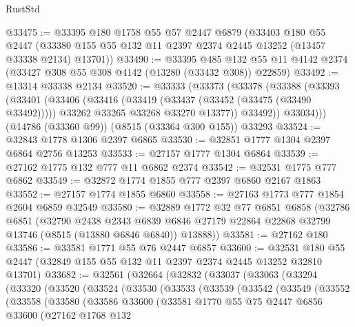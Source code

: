 \begin{lexlean}{RustStd}
\begin{coremodule}
@33475 := @33395
    @180
    @1758
    @55
    @57
    @2447
    @6879
    (@33403
      @180
      @55
      @2447
      (@33380 @155 @55 @132 @11 @2397 @2374 @2445 @13252 (@13457 @33338 @2134) @13701))
@33490 := @33395
    @485
    @132
    @55
    @11
    @4142
    @2374
    (@33427 @308 @55 @308 @4142 (@13280 (@33432 @308)) @22859)
@33492 := @13314 @33338 @2134
@33520 := @33333
    (@33373
      (@33378
        (@33388
          (@33393
            (@33401
              (@33406
                (@33416
                  (@33419 (@33437 (@33452 (@33475 (@33490 @33492)))))
                  @33262
                  @33265
                  @33268
                  @33270
                  @13377))
              @33492))
          @33034)))
    (@14786 (@33360 @99))
    (@8515 (@33364 @300 @155))
    @33293
@33524 := @32843 @1778 @1306 @2397 @6865
@33530 := @32851 @1777 @1304 @2397 @6864 @2756 @13253
@33533 := @27157 @1777 @1304 @6864
@33539 := @27162 @1775 @132 @777 @11 @6862 @2374
@33542 := @32531 @1775 @777 @6862
@33549 := @32872 @1774 @1855 @777 @2397 @6860 @2167 @1863
@33552 := @27157 @1774 @1855 @6860
@33558 := @27163 @1773 @777 @1854 @2604 @6859 @32549
@33580 := @32889
    @1772
    @32
    @77
    @6851
    @6858
    (@32786
      @6851
      (@32790
        @2438
        @2343
        @6839
        @6846
        @27179
        @22864
        @22868
        @32799
        @13746
        (@8515 (@13880 @6846 @6840))
        @13888))
@33581 := @27162 @180
@33586 := @33581 @1771 @55 @76 @2447 @6857
@33600 := @32531 @180 @55 @2447 (@32849 @155 @55 @132 @11 @2397 @2374 @2445 @13252 @32810 @13701)
@33682 := @32561
    (@32664
      (@32832
        (@33037
          (@33063
            (@33294
              (@33320
                (@33520
                  (@33524
                    (@33530
                      (@33533
                        (@33539
                          (@33542
                            (@33549
                              (@33552
                                (@33558
                                  (@33580
                                    (@33586
                                      @33600
                                      (@33581
                                        @1770
                                        @55
                                        @75
                                        @2447
                                        @6856
                                        @33600
                                        (@27162
                                          @1768
                                          @132

\end{coremodule}
\end{lexlean}
